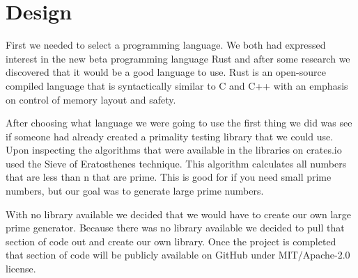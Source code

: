 \documentclass[12pt,technote]{IEEEtran}
\begin{document}
\section{Design}
First we needed to select a programming language. We both had expressed 
interest in the new beta programming language Rust and after some research we 
discovered that it would be a good language to use. Rust is an open-source 
compiled language that is syntactically similar to C and C++ with an emphasis on 
control of memory layout and safety.  

\par After choosing what language we were going to use the first thing we did 
was see if someone had already created a primality testing library that we could 
use. Upon inspecting the algorithms that were available in the libraries on 
crates.io used the Sieve of Eratosthenes technique. This algorithm calculates 
all numbers that are less than n that are prime. This is good for if you need 
small prime numbers, but our goal was to generate large prime numbers. 

\par With no library available we decided that we would have to create our own 
large prime generator. Because there was no library available we decided to pull 
that section of code out and create our own library. Once the project is 
completed that section of code will be publicly available on GitHub under 
MIT/Apache-2.0 license.
\end{document}
